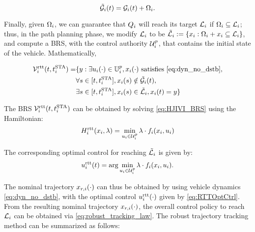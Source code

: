 \begin{equation} 
\label{eqn:rttAugObs}
\tilde{\obsset}_i(t) = \obsset_i(t) + \disckernel_i.
\end{equation}

Finally, given $\Omega_i$, we can guarantee that $Q_i$ will reach its target $\mathcal{L}_i$ if $\Omega_i \subseteq \mathcal{L}_i$; thus, in the path planning phase, we modify $\mathcal{L}_i$ to be $\tilde{\mathcal{L}}_i := \{x_i: \Omega_i + x_i \subseteq \mathcal{L}_i\}$, and compute a BRS, with the control authority $\mathcal{U}^p_i$, that contains the initial state of the vehicle. Mathematically,

\begin{equation}
\label{eq:rttBRS}
\begin{aligned}
\brs_i^\text{rtt}(t, \sta_i) = & \{y: \exists \ctrl_i(\cdot) \in \cfset^p_i, \state_i(\cdot) \text{ satisfies \eqref{eq:dyn_no_dstb}},\\
&\forall s \in [t, \sta_i], \state_i(s) \notin \tilde{\obsset}_i(t), \\
& \exists s \in [t, \sta_i], \state_i(s) \in \tilde{\targetset}_i, \state_i(t) = y\}
\end{aligned}
\end{equation}

The BRS $\mathcal{V}_i^\text{rtt}(t, t^\text{STA}_i)$ can be obtained by solving \eqref{eq:HJIVI_BRS} using the Hamiltonian: 
\begin{equation}
\label{eq:RTTham}
\ham_i^\text{rtt}(\state_i, \costate) = \min_{\ctrl_i \in \cset^\pos_i } \costate \cdot \fdyn_i(\state_i, \ctrl_i)
\end{equation}

The corresponding optimal control for reaching $\tilde{\mathcal{L}}_i$ is given by:
\begin{equation}
\label{eq:RTTOptCtrl}
\ctrl_i^\text{rtt}(t) = \arg \min_{\ctrl_i \in \cset^\pos_i } \costate \cdot \fdyn_i(\state_i, \ctrl_i).
\end{equation}

The nominal trajectory $x_{r,i}(\cdot)$ can thus be obtained by using vehicle dynamics \eqref{eq:dyn_no_dstb}, with the optimal control  $u_i^\text{rtt}(\cdot)$ given by \eqref{eq:RTTOptCtrl}. From the resulting nominal trajectory $x_{r,i}(\cdot)$, the overall control policy to reach $\mathcal{L}_i$ can be obtained via \eqref{eq:robust_tracking_law}. The robust trajectory tracking method can be summarized as follows:

